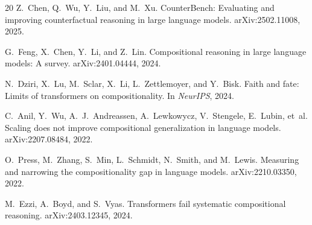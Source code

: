 \documentclass[11pt,a4paper]{article}
\begin{document}
\begin{thebibliography}{20}
Z.~Chen, Q.~Wu, Y.~Liu, and M.~Xu.
\newblock CounterBench: Evaluating and improving counterfactual reasoning in large language models.
\newblock arXiv:2502.11008, 2025.

G.~Feng, X.~Chen, Y.~Li, and Z.~Lin.
\newblock Compositional reasoning in large language models: A survey.
\newblock arXiv:2401.04444, 2024.

N.~Dziri, X.~Lu, M.~Sclar, X.~Li, L.~Zettlemoyer, and Y.~Bisk.
\newblock Faith and fate: Limits of transformers on compositionality.
\newblock In {\em NeurIPS}, 2024.

C.~Anil, Y.~Wu, A.~J.~Andreassen, A.~Lewkowycz, V.~Stengele, E.~Lubin, et~al.
\newblock Scaling does not improve compositional generalization in language models.
\newblock arXiv:2207.08484, 2022.

O.~Press, M.~Zhang, S.~Min, L.~Schmidt, N.~Smith, and M.~Lewis.
\newblock Measuring and narrowing the compositionality gap in language models.
\newblock arXiv:2210.03350, 2022.

M.~Ezzi, A.~Boyd, and S.~Vyas.
\newblock Transformers fail systematic compositional reasoning.
\newblock arXiv:2403.12345, 2024.

\end{thebibliography}
\end{document}
